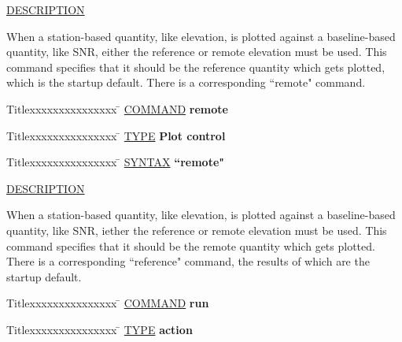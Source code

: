 \underline{DESCRIPTION}
\begin{list}{}{\setlength{\leftmargin}{0.5in}
     \setlength{\rightmargin}{0in}}
\item
When a station-based quantity, like elevation, is plotted against a
baseline-based quantity, like SNR, either the reference or remote
elevation must be used.  This command specifies that it should be
the reference quantity which gets plotted, which is the startup
default.  There is a corresponding ``remote" command.
\end{list}
\vspace{.2in}

\begin{tabbing}
Titlexxxxxxxxxxxxxxx \= \kill
\underline{COMMAND} \> {\bf 	remote} \\
\end{tabbing}

\begin{tabbing}
Titlexxxxxxxxxxxxxxx \= \kill
\underline{TYPE} \> {\bf 		Plot control} \\
\end{tabbing}

\begin{tabbing}
Titlexxxxxxxxxxxxxxx \= \kill
\underline{SYNTAX} \> {\bf 		``remote"} \\
\end{tabbing}

\underline{DESCRIPTION}
\begin{list}{}{\setlength{\leftmargin}{0.5in}
     \setlength{\rightmargin}{0in}}
\item
When a station-based quantity, like elevation, is plotted against a
baseline-based quantity, like SNR, iether the reference or remote
elevation must be used.  This command specifies that it should be
the remote quantity which gets plotted.  There is a corresponding
``reference" command, the results of which are the startup default.
\end{list}
\vspace{.2in}

\begin{tabbing}
Titlexxxxxxxxxxxxxxx \= \kill
\underline{COMMAND} \> {\bf 	run} \\
\end{tabbing}

\begin{tabbing}
Titlexxxxxxxxxxxxxxx \= \kill
\underline{TYPE} \> {\bf 		action} \\
\end{tabbing}

